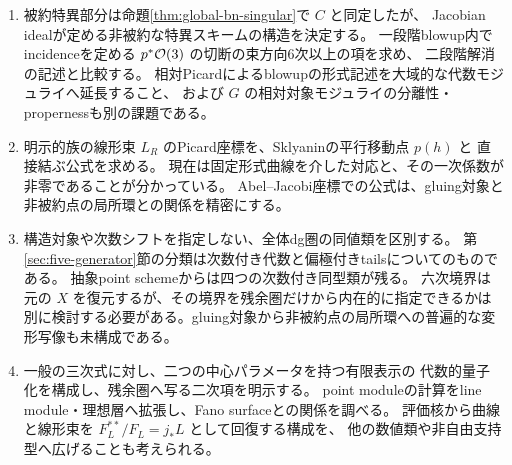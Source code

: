 \begin{enumerate}
 \item 被約特異部分は命題\ref{thm:global-bn-singular}で $C$ と同定したが、
 Jacobian idealが定める非被約な特異スキームの構造を決定する。
 一段階blowup内でincidenceを定める $p^*\mathcal O(3)$ の切断の束方向6次以上の項を求め、
 二段階解消の記述と比較する。
 相対Picardによるblowupの形式記述を大域的な代数モジュライへ延長すること、
 および $G$ の相対対象モジュライの分離性・propernessも別の課題である。
 \item 明示的族の線形束 $L_R$ のPicard座標を、Sklyaninの平行移動点 $p(h)$ と
 直接結ぶ公式を求める。
 現在は固定形式曲線を介した対応と、その一次係数が非零であることが分かっている。
 Abel--Jacobi座標での公式は、gluing対象と非被約点の局所環との関係を精密にする。
 \item 構造対象や次数シフトを指定しない、全体dg圏の同値類を区別する。
 第\ref{sec:five-generator}節の分類は次数付き代数と偏極付きtailsについてのものである。
 抽象point schemeからは四つの次数付き同型類が残る。
 六次境界は元の $X$ を復元するが、その境界を残余圏だけから内在的に指定できるかは
 別に検討する必要がある。gluing対象から非被約点の局所環への普遍的な変形写像も未構成である。
 \item 一般の三次式に対し、二つの中心パラメータを持つ有限表示の
 代数的量子化を構成し、残余圏へ写る二次項を明示する。
 point moduleの計算をline module・理想層へ拡張し、Fano surfaceとの関係を調べる。
 評価核から曲線と線形束を $F_L^{**}/F_L=j_*L$ として回復する構成を、
 他の数値類や非自由支持型へ広げることも考えられる。
\end{enumerate}
